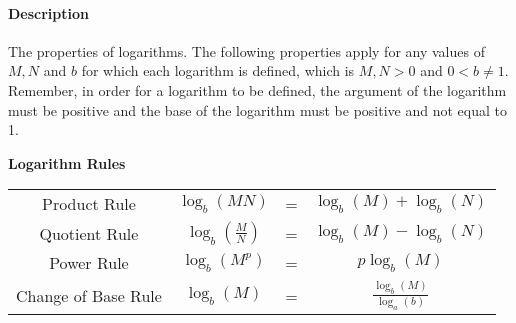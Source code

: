 \documentclass[12pt]{article}
\begin{document}
\paragraph{Description} The properties of logarithms. The following properties apply for any values of $M, N$ and $b$ for which each logarithm is defined, which is $M,N > 0$ and $0 < b \ne 1$. Remember, in order for a logarithm to be defined, the argument of the logarithm must be positive and the base of the logarithm must be positive and not equal to 1.

{ %
\begin{center}
\textbf{Logarithm Rules} \vspace{3mm} \\
\LARGE \def\arraystretch{2} %
\begin{tabular}{cccc}
  Product Rule & $\log_{b}(MN)$ & = & $\log_{b}(M) + \log_{b}(N)$ \\
  Quotient Rule & $\log_{b}(\frac{M}{N})$ & = & $\log_{b}(M) - \log_{b}(N)$ \\
  Power Rule & $\log_{b}(M^{p})$ & = & $p\log_{b}(M)$ \\
  Change of Base Rule & $\log_{b}(M)$ & = & $\frac{\log_{b}(M)}{\log_{a}(b)}$ \\
\end{tabular} \\
\end{center}
}
\end{document}
